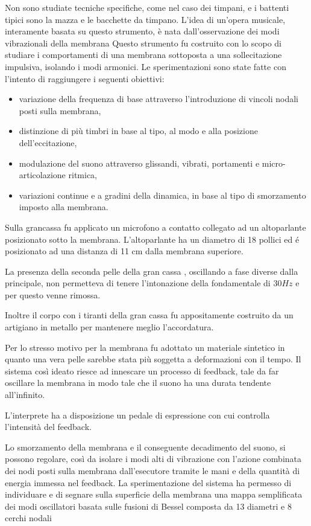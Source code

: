 Non sono studiate tecniche specifiche, come nel caso dei timpani, e i battenti
tipici sono la mazza e le bacchette da timpano. L’idea di un’opera musicale,
interamente basata su questo strumento, è nata dall’osservazione dei modi
vibrazionali della membrana
Questo strumento fu costruito con lo scopo di studiare i comportamenti di una
membrana sottoposta a una sollecitazione impulsiva, isolando i modi armonici.
Le sperimentazioni sono state fatte con l’intento di raggiungere i seguenti
obiettivi:
\begin{itemize}
  \item variazione della frequenza di base attraverso l’introduzione di vincoli
nodali posti sulla membrana,
  \item distinzione di più timbri in base al tipo, al modo e alla posizione
dell’eccitazione,
  \item modulazione del suono attraverso glissandi, vibrati, portamenti e
micro-articolazione ritmica,
  \item variazioni continue e a gradini della dinamica, in base al tipo di
  smorzamento imposto alla membrana.
\end{itemize}

Sulla grancassa fu applicato un microfono a contatto collegato ad un altoparlante
posizionato sotto la membrana.
L’altoparlante ha un diametro di 18 pollici ed é posizionato ad una distanza di
11 cm dalla membrana superiore.


La presenza della seconda pelle della gran cassa , oscillando a fase diverse
dalla principale, non permetteva di tenere l’intonazione della fondamentale di
$30Hz$ e per questo venne rimossa.

Inoltre il corpo con i tiranti della gran cassa fu appositamente costruito da un
artigiano in metallo per mantenere meglio l’accordatura.

Per lo stresso motivo per la membrana fu adottato  un materiale sintetico in
quanto una vera pelle sarebbe stata più soggetta a deformazioni con il tempo.
Il sistema così ideato riesce ad innescare un processo di feedback, tale da far
oscillare la membrana in modo tale che il suono ha una durata tendente
all’infinito.

L’interprete ha a disposizione un pedale di espressione con cui controlla
l’intensità del feedback.

Lo smorzamento della membrana e il conseguente decadimento del suono, si possono
regolare, così da isolare i modi alti di vibrazione con l’azione combinata dei
nodi posti sulla membrana dall’esecutore tramite le mani e della quantità di
energia immessa nel feedback. La sperimentazione del sistema ha permesso di
individuare e di segnare sulla superficie della membrana una mappa semplificata
dei modi oscillatori basata sulle fusioni di Bessel composta da 13 diametri e
8 cerchi nodali

